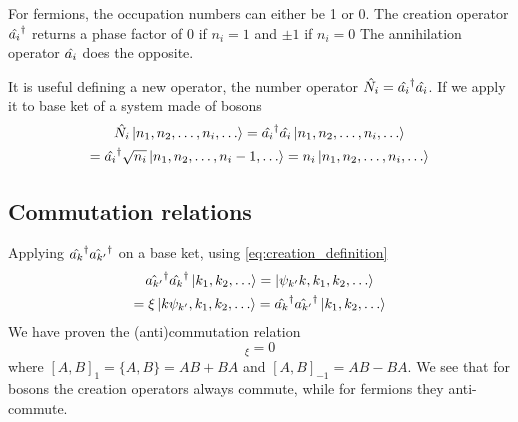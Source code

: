 
For fermions, the occupation numbers can either be 1 or 0. The creation operator $\hat{a_i}^\dagger$ returns a phase factor of 0 if $n_i=1$ and $\pm 1$ if $n_i=0$ The annihilation operator $\hat{a_i}$ does the opposite.

It is useful defining a new operator, the number operator $\hat{N_i} = \hat{a_i}^\dagger\hat{a_i}$. If we apply it to base ket of a system made of bosons
\begin{multline} \label{eq:number_operator}
    \hat{N_i} \ket{n_1, n_2, \dots, n_i, \dots}
    = \hat{a_i}^\dagger\hat{a_i} \ket{n_1, n_2, \dots, n_i, \dots}
    \\ = \hat{a_i}^\dagger \sqrt{n_i} \ket{n_1, n_2, \dots, n_i-1, \dots}
    = n_i \ket{n_1, n_2, \dots, n_i, \dots}
\end{multline}

\subsection{Commutation relations}
Applying $\hat{a_k}^\dagger\hat{a_{k'}}^\dagger$ on a base ket, using  \cref{eq:creation_definition}
\begin{multline}
    \hat{a_{k'}}^\dagger\hat{a_{k}}^\dagger \ket{k_1, k_2, \dots}
    = \ket{\psi_{k'}k,k_1, k_2, \dots}
    \\= \xi \ket{k\psi_{k'},k_1, k_2, \dots}
    = \hat{a_k}^\dagger\hat{a_{k'}}^\dagger\ket{k_1, k_2, \dots}
\end{multline}
We have proven the (anti)commutation relation
\begin{equation}
    [\adjop{a_k}, \adjop{a_{k'}}]_\xi = 0
\end{equation}
where $[A,B]_1 = \{A,B\} = AB+BA$ and $[A,B]_{-1} = AB - BA$. We see that for bosons the creation operators always commute, while for fermions they anti-commute.

